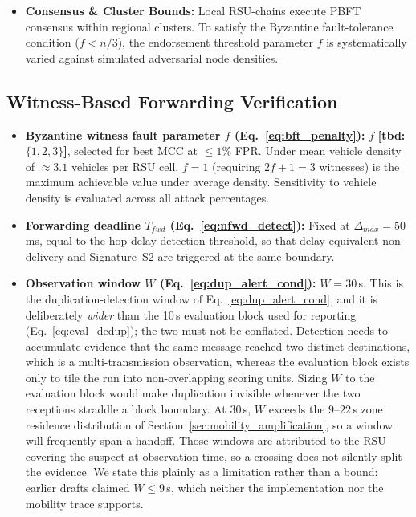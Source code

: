 \documentclass[12pt, a4paper]{report}
\begin{document}
{{\begin{itemize}
    
    \item \textbf{Consensus \& Cluster Bounds:} Local RSU-chains execute PBFT consensus within regional clusters. To satisfy the Byzantine fault-tolerance condition ($f < n/3$), the endorsement threshold parameter $f$ is systematically varied against simulated adversarial node densities.

\end{itemize}

\subsection{Witness-Based Forwarding Verification}
\begin{itemize}
    \item \textbf{Byzantine witness fault parameter
    $f$ (Eq.~\ref{eq:bft_penalty}):}
    $f$ \textbf{[tbd: $\{1, 2, 3\}$]}, selected
    for best MCC at $\leq 1\%$ FPR. Under mean
    vehicle density of $\approx 3.1$ vehicles per
    RSU cell, $f{=}1$ (requiring $2f{+}1{=}3$
    witnesses) is the maximum achievable value
    under average density. Sensitivity to vehicle
    density is evaluated across all attack
    percentages.

    \item \textbf{Forwarding deadline $T_{fwd}$
    (Eq.~\ref{eq:nfwd_detect}):}
    Fixed at $\Delta_{max} = 50$\,ms, equal to
    the hop-delay detection threshold, so that
    delay-equivalent non-delivery and Signature~S2
    are triggered at the same boundary.

    \item \textbf{Observation window $W$
    (Eq.~\ref{eq:dup_alert_cond}):} $W = 30$\,s.
    This is the duplication-detection window of
    Eq.~\eqref{eq:dup_alert_cond}, and it is
    deliberately \emph{wider} than the 10\,s
    evaluation block used for reporting
    (Eq.~\eqref{eq:eval_dedup}); the two must not be
    conflated. Detection needs to accumulate evidence
    that the same message reached two distinct
    destinations, which is a multi-transmission
    observation, whereas the evaluation block exists
    only to tile the run into non-overlapping scoring
    units. Sizing $W$ to the evaluation block would
    make duplication invisible whenever the two
    receptions straddle a block boundary.
    At $30$\,s, $W$ exceeds the $9$--$22$\,s zone
    residence distribution of
    Section~\ref{sec:mobility_amplification}, so a
    window will frequently span a handoff. Those
    windows are attributed to the \ac{RSU} covering
    the suspect at observation time, so a crossing
    does not silently split the evidence. We state
    this plainly as a limitation rather than a bound:
    earlier drafts claimed $W \leq 9$\,s, which
    neither the implementation nor the mobility trace
    supports.
\end{itemize}


}}
\end{document}
